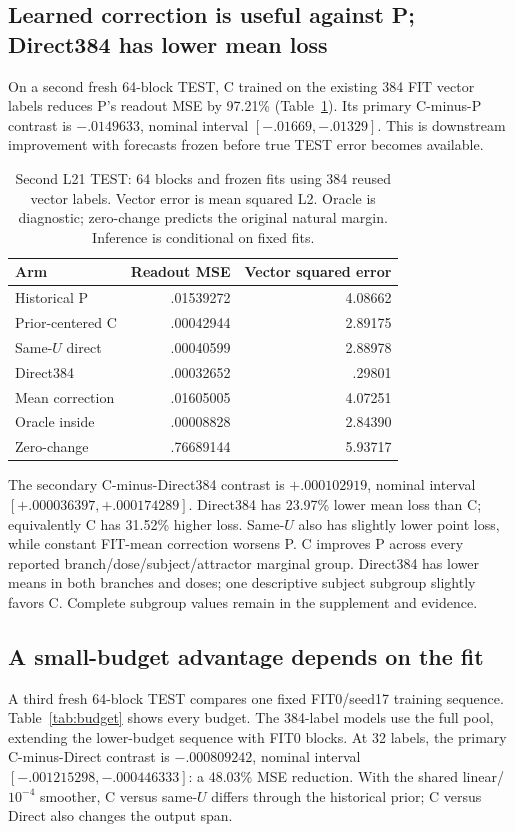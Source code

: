 \documentclass[11pt]{article}
\begin{document}
\subsection{Learned correction is useful against P; Direct384 has lower mean loss}
On a second fresh 64-block TEST, C trained on the existing 384 FIT vector labels reduces P's readout MSE by 97.21\% (Table~\ref{tab:learned}). Its primary C-minus-P contrast is $-.0149633$, nominal interval $[-.01669,-.01329]$. This is downstream improvement with forecasts frozen before true TEST error becomes available.

\begin{table}[ht]\centering\small
\begin{tabular}{lrr}\toprule Arm & Readout MSE & Vector squared error\\\midrule
Historical P & .01539272 & 4.08662\\
Prior-centered C & .00042944 & 2.89175\\
Same-$U$ direct & .00040599 & 2.88978\\
Direct384 & .00032652 & .29801\\
Mean correction & .01605005 & 4.07251\\
Oracle inside & .00008828 & 2.84390\\
Zero-change & .76689144 & 5.93717\\\bottomrule\end{tabular}
\caption{Second L21 TEST: 64 blocks and frozen fits using 384 reused vector labels. Vector error is mean squared L2. Oracle is diagnostic; zero-change predicts the original natural margin. Inference is conditional on fixed fits.}\label{tab:learned}
\end{table}

The secondary C-minus-Direct384 contrast is $+.000102919$, nominal interval $[+.000036397,+.000174289]$. Direct384 has 23.97\% lower mean loss than C; equivalently C has 31.52\% higher loss. Same-$U$ also has slightly lower point loss, while constant FIT-mean correction worsens P. C improves P across every reported branch/dose/subject/attractor marginal group. Direct384 has lower means in both branches and doses; one descriptive subject subgroup slightly favors C. Complete subgroup values remain in the supplement and evidence.

\subsection{A small-budget advantage depends on the fit}
A third fresh 64-block TEST compares one fixed FIT0/seed17 training sequence. Table~\ref{tab:budget} shows every budget. The 384-label models use the full pool, extending the lower-budget sequence with FIT0 blocks. At 32 labels, the primary C-minus-Direct contrast is $-.000809242$, nominal interval $[-.001215298,-.000446333]$: a 48.03\% MSE reduction. With the shared linear/$10^{-4}$ smoother, C versus same-$U$ differs through the historical prior; C versus Direct also changes the output span.
\end{document}

